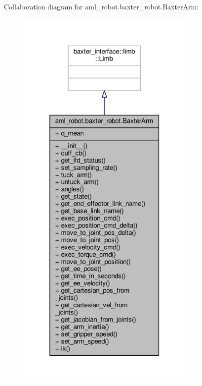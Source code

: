 Collaboration diagram for aml\-\_\-robot.\-baxter\-\_\-robot.\-Baxter\-Arm\-:\nopagebreak
\begin{figure}[H]
\begin{center}
\leavevmode
\includegraphics[height=550pt]{classaml__robot_1_1baxter__robot_1_1_baxter_arm__coll__graph}
\end{center}
\end{figure}

